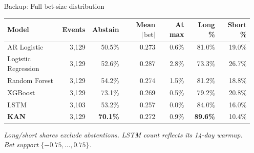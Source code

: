 \documentclass[aspectratio=169, t]{beamer}
\begin{document}
\begin{frame}{Backup: Full bet-size distribution}
\vspace{-0.6em}
\begin{center}
\renewcommand{\arraystretch}{1.2}
\scriptsize
\begin{tabular}{l r r r r r r}
\toprule
\textbf{Model} & \textbf{Events} & \textbf{Abstain} & \textbf{Mean $|\mathrm{bet}|$} & \textbf{At max} & \textbf{Long \%} & \textbf{Short \%} \\
\midrule
AR Logistic         & 3{,}129 & 50.5\% & 0.273 & 0.6\% & 81.0\% & 19.0\% \\
Logistic Regression & 3{,}129 & 52.6\% & 0.287 & 2.8\% & 73.3\% & 26.7\% \\
Random Forest       & 3{,}129 & 54.2\% & 0.274 & 1.5\% & 81.2\% & 18.8\% \\
XGBoost             & 3{,}129 & 73.1\% & 0.269 & 0.5\% & 79.2\% & 20.8\% \\
LSTM                & 3{,}103 & 53.2\% & 0.257 & 0.0\% & 84.0\% & 16.0\% \\
\textbf{KAN}        & 3{,}129 & \textbf{70.1\%} & 0.272 & 0.9\% & \textbf{89.6\%} & 10.4\% \\
\bottomrule
\end{tabular}
\end{center}
\vspace{0.3em}
{\scriptsize\itshape Long/short shares exclude abstentions. LSTM count reflects its 14-day warmup. Bet support $\{-0.75, \ldots, 0.75\}$.}
\end{frame}
\end{document}
